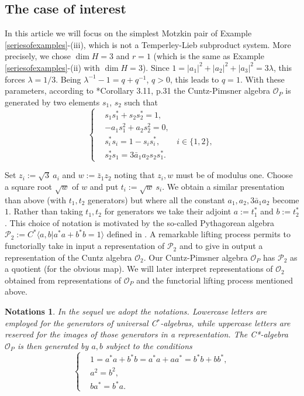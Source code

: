 \documentclass[12pt, a4paper]{amsart}
\def\dim{\operatorname{dim}}
\newcommand{\CO}[0]{\mathcal{O}} \newcommand{\CP}[0]{\mathcal{P}}
\newtheorem*{notations}{Notations}
\numberwithin{equation}{section}
\begin{document}
\subsection{The case of interest}
In this article we will focus on the simplest Motzkin pair of 
Example \ref{seriesofexamples}-(iii), which is not a Temperley-Lieb subproduct system.
More precisely, we chose
$\dim H=3$ and $r=1$ (which is the same as Example \ref{seriesofexamples}-(ii) with $\dim H=3$). 
Since $1=|a_1|^2+|a_2|^2+|a_3|^2=3\lambda$, this forces $\lambda =1/3$.
Being $\lambda^{-1} -1= q+q^{-1}$, $q>0$, this leads to $q=1$. With these parameters, according to \cite{ADR01}*{Corollary 3.11, p.31} the Cuntz-Pimsner algebra $\CO_P$ is generated by two elements $s_1$, $s_2$ such that
\begin{equation}\label{first_version_relations}
\begin{cases}
    & s_1s_1^*+s_2s_2^*=1,\\
& -a_1s_1^2+a_2s_2^2=0,\\
&s_i^*s_i=1-s_is_i^*, \qquad i\in\{1, 2\}, \\
&s_2^*s_1=3\bar{a}_1 a_2s_2s_1^*. 
\end{cases}
\end{equation}

Set $z_i:=\sqrt{3}\ a_i$ and $w:=\bar z_1 z_2$ noting that $z_i,w$ must be of modulus one.
Choose a square root $\sqrt{w}$ of $w$ and put $t_i:=\sqrt{w}\ s_i.$
We obtain a similar presentation than above (with $t_1,t_2$ generators) but where all the constant $a_1,a_2,3\bar a_1a_2$ become $1$.
Rather than taking $t_1,t_2$ for generators we take their adjoint $a:=t_1^*$ and $b:=t_2^*$.
This choice of notation is motivated by the so-called Pythagorean algebra $\CP_2:=C^*\langle a,b| a^*a+b^*b=1\rangle$ defined in \cite{Brothier-Jones19}.
A remarkable lifting process permits to functorially take in input a representation of $\CP_2$ and to give in output a representation of the Cuntz algebra $\CO_2$.
Our Cuntz-Pimsner algebra $\CO_P$ has $\CP_2$ as a quotient (for the obvious map). 
We will later interpret representations of $\CO_2$ obtained from representations of $\CO_P$ and the functorial lifting process mentioned above.

\begin{notations} 
In the sequel we adopt the notations. Lowercase letters are employed for the generators of universal C$^*$-algebras, while uppercase letters are reserved for
the images of those generators in a representation. 
The C*-algebra $\CO_P$ is then generated by $a,b$ subject to the conditions
\begin{equation}\label{second_version_relations}
\begin{cases}
&1=a^*a+b^*b=a^*a+aa^*=b^*b+bb^*,\\
& a^2=b^2,\\
&ba^*=b^*a. 
\end{cases}    
\end{equation}
\end{notations}
\end{document}
